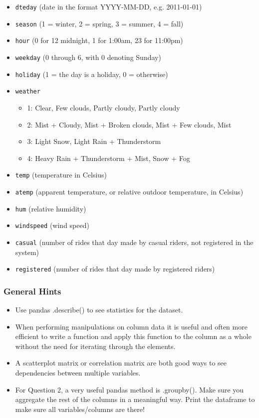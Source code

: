 \documentclass[11pt]{article}
\providecommand{\tightlist}{%
      \setlength{\itemsep}{0pt}\setlength{\parskip}{0pt}}
\begin{document}
\begin{itemize}
\tightlist
\item
  \texttt{dteday} (date in the format YYYY-MM-DD, e.g. 2011-01-01)
\item
  \texttt{season} (1 = winter, 2 = spring, 3 = summer, 4 = fall)
\item
  \texttt{hour} (0 for 12 midnight, 1 for 1:00am, 23 for 11:00pm)
\item
  \texttt{weekday} (0 through 6, with 0 denoting Sunday)
\item
  \texttt{holiday} (1 = the day is a holiday, 0 = otherwise)
\item
  \texttt{weather}

  \begin{itemize}
  \tightlist
  \item
    1: Clear, Few clouds, Partly cloudy, Partly cloudy
  \item
    2: Mist + Cloudy, Mist + Broken clouds, Mist + Few clouds, Mist
  \item
    3: Light Snow, Light Rain + Thunderstorm
  \item
    4: Heavy Rain + Thunderstorm + Mist, Snow + Fog
  \end{itemize}
\item
  \texttt{temp} (temperature in Celsius)
\item
  \texttt{atemp} (apparent temperature, or relative outdoor temperature,
  in Celsius)
\item
  \texttt{hum} (relative humidity)
\item
  \texttt{windspeed} (wind speed)
\item
  \texttt{casual} (number of rides that day made by casual riders, not
  registered in the system)
\item
  \texttt{registered} (number of rides that day made by registered
  riders)
\end{itemize}

    \subsubsection{General Hints}\label{general-hints}

\begin{itemize}
\tightlist
\item
  Use pandas .describe() to see statistics for the dataset.
\item
  When performing manipulations on column data it is useful and often
  more efficient to write a function and apply this function to the
  column as a whole without the need for iterating through the elements.
\item
  A scatterplot matrix or correlation matrix are both good ways to see
  dependencies between multiple variables.
\item
  For Question 2, a very useful pandas method is .groupby(). Make sure
  you aggregate the rest of the columns in a meaningful way. Print the
  dataframe to make sure all variables/columns are there!
\end{itemize}
\end{document}
